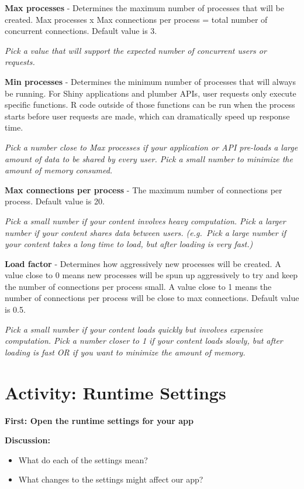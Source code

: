 \documentclass[]{book}
\providecommand{\tightlist}{%
  \setlength{\itemsep}{0pt}\setlength{\parskip}{0pt}}
\theoremstyle{definition}
\theoremstyle{definition}
\theoremstyle{definition}
\theoremstyle{remark}
\begin{document}
\textbf{Max processes} - Determines the maximum number of processes that
will be created. Max processes x Max connections per process = total
number of concurrent connections. Default value is 3.

\emph{Pick a value that will support the expected number of concurrent
users or requests.}

\textbf{Min processes} - Determines the minimum number of processes that
will always be running. For Shiny applications and plumber APIs, user
requests only execute specific functions. R code outside of those
functions can be run when the process starts before user requests are
made, which can dramatically speed up response time.

\emph{Pick a number close to Max processes if your application or API
pre-loads a large amount of data to be shared by every user. Pick a
small number to minimize the amount of memory consumed.}

\textbf{Max connections per process} - The maximum number of connections
per process. Default value is 20.

\emph{Pick a small number if your content involves heavy computation.
Pick a larger number if your content shares data between users.
(e.g.~Pick a large number if your content takes a long time to load, but
after loading is very fast.)}

\textbf{Load factor} - Determines how aggressively new processes will be
created. A value close to 0 means new processes will be spun up
aggressively to try and keep the number of connections per process
small. A value close to 1 means the number of connections per process
will be close to max connections. Default value is 0.5.

\emph{Pick a small number if your content loads quickly but involves
expensive computation. Pick a number closer to 1 if your content loads
slowly, but after loading is fast OR if you want to minimize the amount
of memory.}

\hypertarget{activity-runtime-settings}{%
\section{Activity: Runtime Settings}\label{activity-runtime-settings}}

\textbf{First: Open the runtime settings for your app}

\textbf{Discussion:}

\begin{itemize}
\tightlist
\item
  What do each of the settings mean?
\item
  What changes to the settings might affect our app?
\end{itemize}
\end{document}
